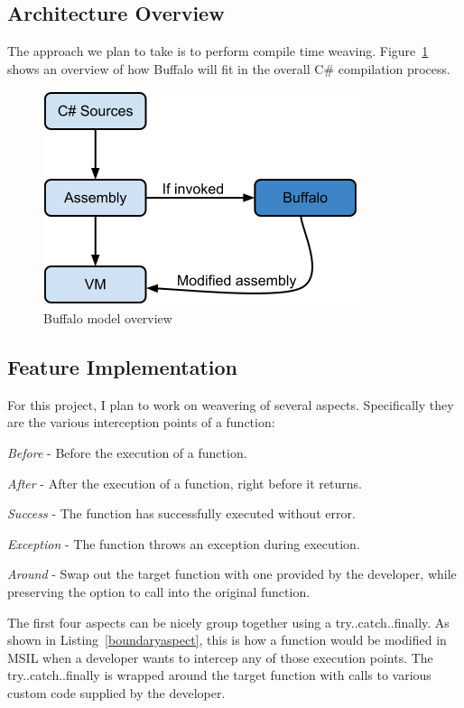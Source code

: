 \subsection{Architecture Overview}
The approach we plan to take is to perform compile time weaving. Figure~\ref{buffalo_model} shows an overview of how Buffalo will fit in the overall C\# compilation process.

\begin{figure}[here]
  \includegraphics[scale=0.70]{model_overview.png}
  \centering
  \caption{Buffalo model overview\label{buffalo_model}}
\end{figure}

\subsection{Feature Implementation}
For this project, I plan to work on weavering of several aspects. Specifically they are the various interception points of a function: 

{\em Before} - Before the execution of a function.

{\em After} - After the execution of a function, right before it returns.

{\em Success} - The function has successfully executed without error.

{\em Exception} - The function throws an exception during execution.

{\em Around} - Swap out the target function with one provided by the developer, while preserving the option to call into the original function.

The first four aspects can be nicely group together using a try..catch..finally. As shown in Listing~\ref{boundaryaspect}, this is how a function would be modified in MSIL when a developer wants to intercep any of those execution points. The try..catch..finally is wrapped around the target function with calls to various custom code supplied by the developer. 

